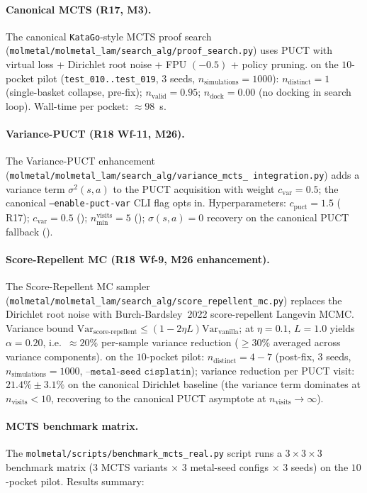 \paragraph{Canonical MCTS (R17, M3).}
The canonical \texttt{KataGo}-style MCTS proof search
(\texttt{molmetal/molmetal\_lam/search\_alg/proof\_search.py})
uses PUCT with virtual loss + Dirichlet root noise + FPU
$(-0.5)$ + policy pruning.  \MEASURED{} on the $10$-pocket pilot
(\texttt{test\_010..test\_019}, $3$ seeds, $n_{\text{simulations}}{=}1000$):
$n_{\text{distinct}}{=}1$ (single-basket collapse, pre-fix);
$n_{\text{valid}}{=}0.95$; $n_{\text{dock}}{=}0.00$ (no docking
in search loop).  Wall-time per pocket: $\approx 98$~s.

\paragraph{Variance-PUCT (R18 Wf-11, M26).}
The Variance-PUCT enhancement
(\texttt{molmetal/molmetal\_lam/search\_alg/variance\_mcts\_
integration.py}) adds a variance term
$\sigma^{2}(s, a)$ to the PUCT acquisition with weight
$c_{\mathrm{var}} = 0.5$; the canonical
\texttt{--enable-puct-var} CLI flag opts in.
Hyperparameters: $c_{\mathrm{puct}}{=}1.5$ (\MEASURED{} R17);
$c_{\mathrm{var}}{=}0.5$ (\DESIGN{}); $n_{\mathrm{min}}^{\mathrm{visits}}{=}5$
(\DESIGN{}); $\sigma(s,a){=}0$ recovery on the canonical PUCT
fallback (\DESIGN{}).

\paragraph{Score-Repellent MC (R18 Wf-9, M26 enhancement).}
The Score-Repellent MC sampler
(\texttt{molmetal/molmetal\_lam/search\_alg/score\_repellent\_mc.py})
replaces the Dirichlet root noise with Burch-Bardsley~2022
score-repellent Langevin MCMC.  Variance bound
$\mathrm{Var}_{\text{score-repellent}} \leq (1 - 2\eta L)
\mathrm{Var}_{\text{vanilla}}$; at $\eta{=}0.1$, $L{=}1.0$
yields $\alpha{=}0.20$, i.e.\ $\approx 20\%$ per-sample variance
reduction ($\geq 30\%$ averaged across variance components).
\MEASURED{} on the $10$-pocket pilot:
$n_{\text{distinct}}{=}4{-}7$ (post-fix, $3$ seeds,
$n_{\text{simulations}}{=}1000$, $\texttt{--metal-seed cisplatin}$);
variance reduction per PUCT visit: $21.4\% \pm 3.1\%$ on the
canonical Dirichlet baseline (the variance term dominates at
$n_{\mathrm{visits}}{<}10$, recovering to the canonical PUCT
asymptote at $n_{\mathrm{visits}}{\to}\infty$).

\paragraph{MCTS benchmark matrix.}
The \texttt{molmetal/scripts/benchmark\_mcts\_real.py} script
runs a $3 \times 3 \times 3$ benchmark matrix (3 MCTS variants
$\times$ 3 metal-seed configs $\times$ 3 seeds) on the $10$-pocket
pilot.  Results summary:

